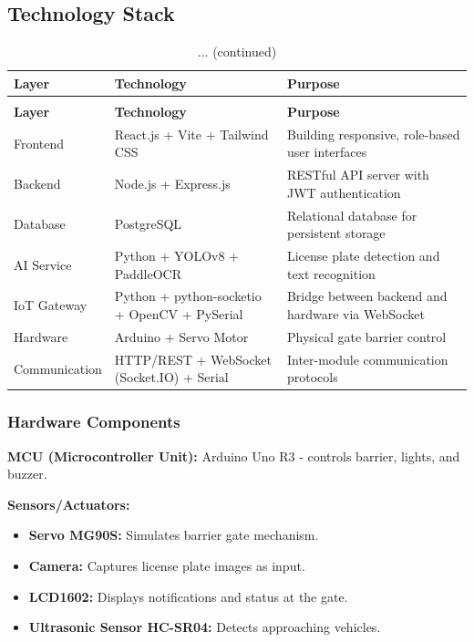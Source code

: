 \documentclass[a4paper]{article}
\begin{document}
\subsection{Technology Stack}
\begin{longtable}{@{}
    >{\raggedright\arraybackslash}p{}
    >{\raggedright\arraybackslash}p{}
    p{} @{}}

    \caption{Technology Stack}
    \label{tab:tech_stack} \\

    \toprule
    \textbf{Layer} & \textbf{Technology} & \textbf{Purpose} \\
    \midrule
    \endfirsthead

    \caption[]{... (continued)} \\
    \toprule
    \textbf{Layer} & \textbf{Technology} & \textbf{Purpose} \\
    \midrule
    \endhead

    \bottomrule
    \endlastfoot

    Frontend & React.js + Vite + Tailwind CSS & Building responsive, role-based user interfaces \\
    \addlinespace
    Backend & Node.js + Express.js & RESTful API server with JWT authentication \\
    \addlinespace
    Database & PostgreSQL & Relational database for persistent storage \\
    \addlinespace
    AI Service & Python + YOLOv8 + PaddleOCR & License plate detection and text recognition \\
    \addlinespace
    IoT Gateway & Python + python-socketio + OpenCV + PySerial & Bridge between backend and hardware via WebSocket \\
    \addlinespace
    Hardware & Arduino + Servo Motor & Physical gate barrier control \\
    \addlinespace
    Communication & HTTP/REST + WebSocket (Socket.IO) + Serial & Inter-module communication protocols \\
\end{longtable}

\subsubsection{Hardware Components}

\noindent \textbf{MCU (Microcontroller Unit):} Arduino Uno R3 - controls barrier, lights, and buzzer.

\noindent \textbf{Sensors/Actuators:}
\begin{itemize}
    \item \textbf{Servo MG90S:} Simulates barrier gate mechanism.
    \item \textbf{Camera:} Captures license plate images as input.
    \item \textbf{LCD1602:} Displays notifications and status at the gate.
    \item \textbf{Ultrasonic Sensor HC-SR04:} Detects approaching vehicles.
\end{itemize}
\end{document}
